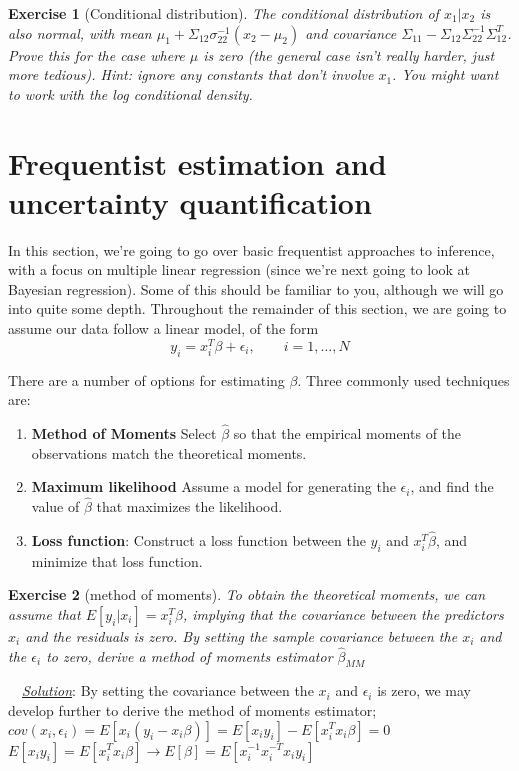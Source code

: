 \documentclass[twoside]{article}
\newcounter{lecnum}
\newtheorem{exercise}{Exercise}[lecnum]
\newenvironment{solution}{
  \begin{flushleft} \noindent ~~\underline{\emph{Solution}}: \rmfamily}{\end{flushleft}}
\begin{document}
\begin{exercise}[Conditional distribution]
  The conditional distribution of $x_1|x_2$ is also normal, with mean $\mu_1+\Sigma_{12}\sigma_{22}^{-1}(x_2-\mu_2)$ and covariance $\Sigma_{11} - \Sigma_{12}\Sigma_{22}^{-1}\Sigma_{12}^T$. Prove this for the case where $\mu$ is zero (the general case isn't really harder, just more tedious). \textit{Hint: ignore any constants that don't involve $x_1$. You might want to work with the log conditional density.}
\end{exercise}  

\section{Frequentist estimation and uncertainty quantification}

In this section, we're going to go over basic frequentist approaches to inference, with a focus on multiple linear regression (since we're next going to look at Bayesian regression). Some of this should be familiar to you, although we will go into quite some depth. Throughout the remainder of this section, we are going to assume our data follow a linear model, of the form
$$y_i = x_i^T\beta + \epsilon_i,\qquad i=1,\dots,N$$

There are a number of options for estimating $\beta$. Three commonly used techniques are:
\begin{enumerate}
\item \textbf{Method of Moments} Select $\hat{\beta}$ so that the empirical moments of the observations match the theoretical moments.
\item \textbf{Maximum likelihood} Assume a model for generating the $\epsilon_i$, and find the value of $\hat{\beta}$ that maximizes the likelihood.
\item \textbf{Loss function}: Construct a loss function between the $y_i$ and $x_i^T\hat{\beta}$, and minimize that loss function.
\end{enumerate}

\begin{exercise}[method of moments]
  To obtain the theoretical moments, we can assume that $E[y_i|x_i] = x_i^T\beta$, implying that the covariance between the predictors $x_i$ and the residuals is zero. By setting the sample covariance between the $x_i$ and the $\epsilon_i$ to zero, derive a method of moments estimator $\hat{\beta}_{MM}$
\end{exercise}

\begin{solution}
By setting the covariance between the $x_i$ and $\epsilon_i$ is zero, we may develop further to derive the method of moments estimator; $ cov(x_i, \epsilon_i) = E[x_i (y_i - x_i \beta)] = E[x_i y_i] - E[x_i^T x_i \beta] = 0$ \\
$E[x_iy_i] = E[x_i^T x_i \beta] \rightarrow E[\beta] = E[x_i^{-1}x_i^{-T}x_iy_i]$
\end{solution}
\end{document}
